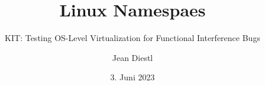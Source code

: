 \documentclass{sdqbeamer}
\title[KIT-Beamer-Vorlage]{Linux Namespaes}
\subtitle{KIT: Testing OS-Level Virtualization
for Functional Interference Bugs}
\author[Jean Diestl]{Jean Diestl}
\date[3.\,6.\,2023]{3. Juni 2023}
\begin{document}
\KITtitleframe
\grouplogo{}




%


%



%

\end{document}

